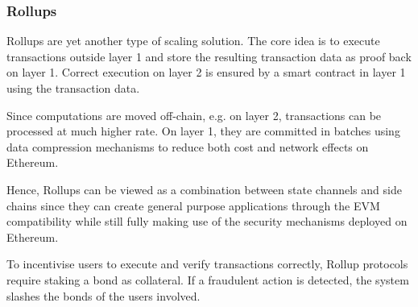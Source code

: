 \subsubsection{Rollups}

Rollups are yet another type of scaling solution. The core idea is to execute transactions outside layer 1 and store the resulting transaction data as proof back on layer 1. Correct execution on layer 2 is ensured by a smart contract in layer 1 using the transaction data. 

Since computations are moved off-chain, e.g. on layer 2, transactions can be processed at much higher rate. On layer 1, they are committed in batches using data compression mechanisms to reduce both cost and network effects on Ethereum. 

Hence, Rollups can be viewed as a combination between state channels and side chains since they can create general purpose applications through the EVM compatibility while still fully making use of the security mechanisms deployed on Ethereum.

To incentivise users to execute and verify transactions correctly, Rollup protocols require staking a bond as collateral. If a fraudulent action is detected, the system slashes the bonds of the users involved. 

